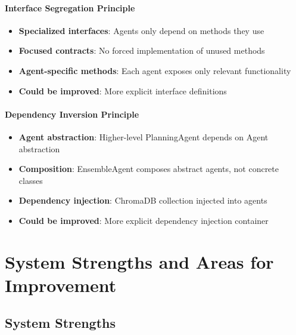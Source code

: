 \paragraph{Interface Segregation Principle \starfull\starfull\starfull\starempty\starempty}
\begin{itemize}
\item[\checkmark] \textbf{Specialized interfaces}: Agents only depend on methods they use
\item[\checkmark] \textbf{Focused contracts}: No forced implementation of unused methods
\item[\checkmark] \textbf{Agent-specific methods}: Each agent exposes only relevant functionality
\item[\checkmark] \textbf{Could be improved}: More explicit interface definitions
\end{itemize}

\paragraph{Dependency Inversion Principle \starfull\starfull\starfull\starempty\starempty}
\begin{itemize}
\item[\checkmark] \textbf{Agent abstraction}: Higher-level PlanningAgent depends on Agent abstraction
\item[\checkmark] \textbf{Composition}: EnsembleAgent composes abstract agents, not concrete classes
\item[\checkmark] \textbf{Dependency injection}: ChromaDB collection injected into agents
\item[\checkmark] \textbf{Could be improved}: More explicit dependency injection container
\end{itemize}

\section{System Strengths and Areas for Improvement}

\subsection{System Strengths}

